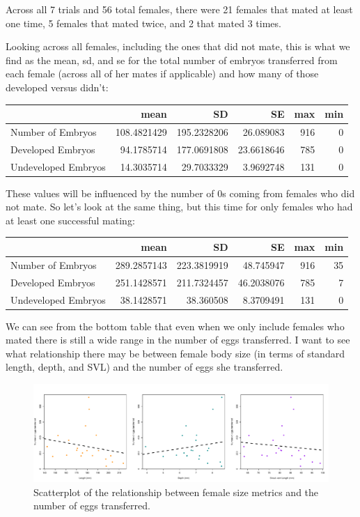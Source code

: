 \documentclass[
]{article}
\begin{document}
Across all 7 trials and 56 total females, there were 21 females that mated at least one time, 5 females that mated twice, and 2 that mated 3 times.

Looking across all females, including the ones that did not mate, this is what we find as the mean, sd, and se for the total number of embryos transferred from each female (across all of her mates if applicable) and how many of those developed versus didn't:

\begin{longtable}[]{@{}lrrrrr@{}}
\toprule\noalign{}
& mean & SD & SE & max & min \\
\midrule\noalign{}
\endhead
\bottomrule\noalign{}
\endlastfoot
Number of Embryos & 108.4821429 & 195.2328206 & 26.089083 & 916 & 0 \\
Developed Embryos & 94.1785714 & 177.0691808 & 23.6618646 & 785 & 0 \\
Undeveloped Embryos & 14.3035714 & 29.7033329 & 3.9692748 & 131 & 0 \\
\end{longtable}

These values will be influenced by the number of 0s coming from females who did not mate. So let's look at the same thing, but this time for only females who had at least one successful mating:

\begin{longtable}[]{@{}lrrrrr@{}}
\toprule\noalign{}
& mean & SD & SE & max & min \\
\midrule\noalign{}
\endhead
\bottomrule\noalign{}
\endlastfoot
Number of Embryos & 289.2857143 & 223.3819919 & 48.745947 & 916 & 35 \\
Developed Embryos & 251.1428571 & 211.7324457 & 46.2038076 & 785 & 7 \\
Undeveloped Embryos & 38.1428571 & 38.360508 & 8.3709491 & 131 & 0 \\
\end{longtable}

We can see from the bottom table that even when we only include females who mated there is still a wide range in the number of eggs transferred. I want to see what relationship there may be between female body size (in terms of standard length, depth, and SVL) and the number of eggs she transferred.

\begin{figure}
\centering
\includegraphics{selection_analysis_floridae_files/figure-latex/em-v-fem-size-1.pdf}
\caption{\label{fig:em-v-fem-size}Scatterplot of the relationship between female size metrics and the number of eggs transferred.}
\end{figure}
\end{document}

